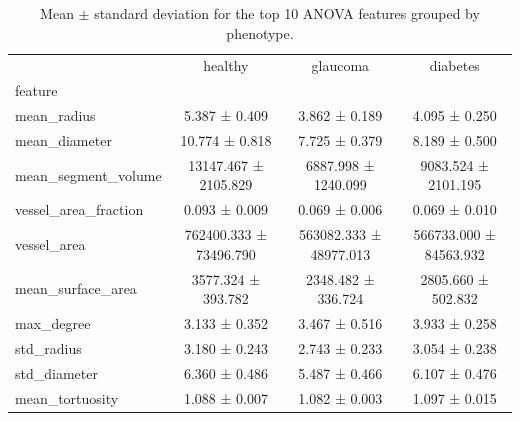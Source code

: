 \begin{table}[htb]
\caption{Mean $\pm$ standard deviation for the top 10 ANOVA features grouped by phenotype.}
\label{tab:top-anova-feature-means}
\begin{tabular}{lccc}
\toprule
 & healthy & glaucoma & diabetes \\
feature &  &  &  \\
\midrule
mean\_radius & 5.387 ± 0.409 & 3.862 ± 0.189 & 4.095 ± 0.250 \\
mean\_diameter & 10.774 ± 0.818 & 7.725 ± 0.379 & 8.189 ± 0.500 \\
mean\_segment\_volume & 13147.467 ± 2105.829 & 6887.998 ± 1240.099 & 9083.524 ± 2101.195 \\
vessel\_area\_fraction & 0.093 ± 0.009 & 0.069 ± 0.006 & 0.069 ± 0.010 \\
vessel\_area & 762400.333 ± 73496.790 & 563082.333 ± 48977.013 & 566733.000 ± 84563.932 \\
mean\_surface\_area & 3577.324 ± 393.782 & 2348.482 ± 336.724 & 2805.660 ± 502.832 \\
max\_degree & 3.133 ± 0.352 & 3.467 ± 0.516 & 3.933 ± 0.258 \\
std\_radius & 3.180 ± 0.243 & 2.743 ± 0.233 & 3.054 ± 0.238 \\
std\_diameter & 6.360 ± 0.486 & 5.487 ± 0.466 & 6.107 ± 0.476 \\
mean\_tortuosity & 1.088 ± 0.007 & 1.082 ± 0.003 & 1.097 ± 0.015 \\
\bottomrule
\end{tabular}
\end{table}
